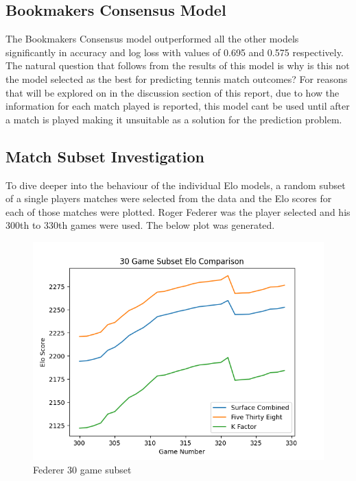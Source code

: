 \documentclass[12pt,a4paper]{article}
\begin{document}
\subsection{Bookmakers Consensus Model}
The Bookmakers Consensus model outperformed all the other models significantly in accuracy
and log loss with values of 0.695 and 0.575 respectively. The natural question that follows
from the results of this model is why is this not the model selected as the best for
predicting tennis match outcomes? For reasons that will be explored on in the discussion
section of this report, due to how the information for each match played is reported, this
model cant be used until after a match is played making it unsuitable as a solution for
the prediction problem.

\subsection{Match Subset Investigation}
To dive deeper into the behaviour of the individual Elo models, a random subset of a single players
matches were selected from the data and the Elo scores for each of those matches were
plotted. Roger Federer was the player selected and his 300th to 330th games were used.
The below plot was generated.

\begin{figure}[H]
  \centering
  \includegraphics[scale=0.8]{images/30_game_subset.png}
  \caption{Federer 30 game subset}
  \label{fig:federer-30}
\end{figure}
\end{document}
